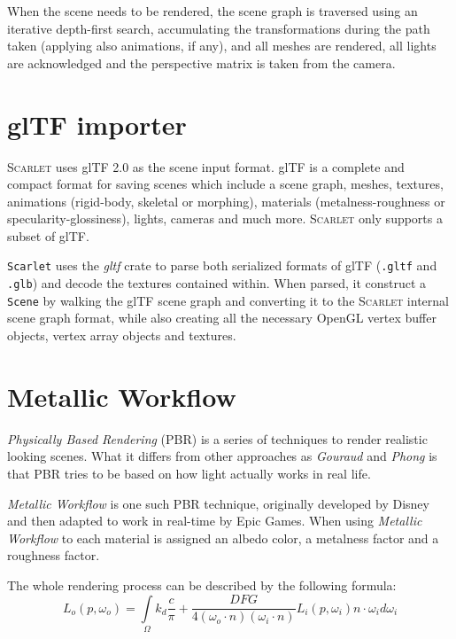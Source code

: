 \documentclass[11pt,a4paper]{report}
\begin{document}
When the scene needs to be rendered, the scene graph is traversed using an iterative depth-first search, accumulating the transformations during the path taken (applying also animations, if any), and all meshes are rendered, all lights are acknowledged and the perspective matrix is taken from the camera.

\section{glTF importer}
\textsc{Scarlet} uses glTF 2.0 as the scene input format. glTF is a complete and compact format for saving scenes which include a scene graph, meshes, textures, animations (rigid-body, skeletal or morphing), materials (metalness-roughness or specularity-glossiness), lights, cameras and much more. \textsc{Scarlet} only supports a subset of glTF.

\texttt{Scarlet} uses the \textit{gltf} crate to parse both serialized formats of glTF (\texttt{.gltf} and \texttt{.glb}) and decode the textures contained within. When parsed, it construct a \texttt{Scene} by walking the glTF scene graph and converting it to the \textsc{Scarlet} internal scene graph format, while also creating all the necessary OpenGL vertex buffer objects, vertex array objects and textures.

\section{Metallic Workflow}
\textit{Physically Based Rendering} (PBR) is a series of techniques to render realistic looking scenes. What it differs from other approaches as \textit{Gouraud} and \textit{Phong} is that PBR tries to be based on how light actually works in real life.

\textit{Metallic Workflow} is one such PBR technique, originally developed by Disney and then adapted to work in real-time by Epic Games. When using \textit{Metallic Workflow} to each material is assigned an albedo color, a metalness factor and a roughness factor.

The whole rendering process can be described by the following formula:
$$ L_o(p, \omega_o) = \int \limits_{\Omega} k_d \frac{c}{\pi} + \frac{DFG}{4(\omega_o \cdot n)(\omega_i \cdot n)} L_i(p, \omega_i)n \cdot \omega_i d \omega_i $$
\end{document}
